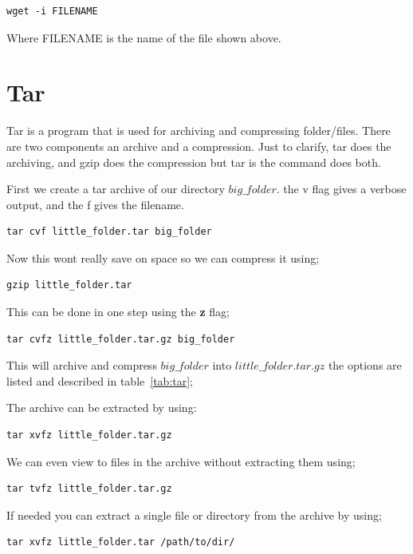\begin{lstlisting}
wget -i FILENAME
\end{lstlisting}

Where FILENAME is the name of the file shown above.


\section{Tar}

Tar is a program that is used for archiving and compressing folder/files. There are two components an archive and a compression.  Just to clarify, tar does the archiving, and gzip does the compression but tar is the command does both.

First we create a tar archive of our directory $big\_folder$.  the v flag gives a verbose output, and the f gives the filename.

\begin{lstlisting}
tar cvf little_folder.tar big_folder
\end{lstlisting}

Now this wont really save on space so we can compress it using;

\begin{lstlisting}
gzip little_folder.tar
\end{lstlisting}

This can be done in one step using the \textbf{z} flag;

\begin{lstlisting}
tar cvfz little_folder.tar.gz big_folder
\end{lstlisting}

This will archive and compress $big\_folder$ into $little\_folder.tar.gz$ the options are listed and described in table~\ref{tab:tar};

The archive can be extracted by using:

\begin{lstlisting}
tar xvfz little_folder.tar.gz
\end{lstlisting}

We can even view to files in the archive without extracting them using;

\begin{lstlisting}
tar tvfz little_folder.tar.gz
\end{lstlisting}

If needed you can extract a single file or directory from the archive by using;

\begin{lstlisting}
tar xvfz little_folder.tar /path/to/dir/
\end{lstlisting}


